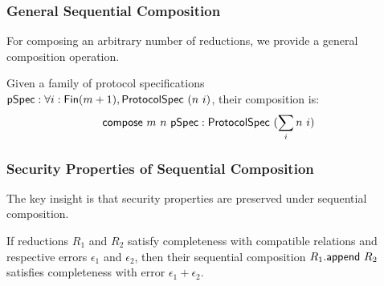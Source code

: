 \subsubsection{General Sequential Composition}

For composing an arbitrary number of reductions, we provide a general composition operation.

\begin{definition}
    \label{def:protocol_spec_compose}
    Given a family of protocol specifications $\mathsf{pSpec} : \forall i : \mathsf{Fin}(m+1), \mathsf{ProtocolSpec}\ (n\ i)$, their composition is:
    \[ \mathsf{compose}\ m\ n\ \mathsf{pSpec} : \mathsf{ProtocolSpec}\ (\sum_{i} n\ i) \]
\end{definition}

\begin{definition}
    \label{def:prover_compose}
\end{definition}

\begin{definition}
    \label{def:verifier_compose}
\end{definition}

\begin{definition}
    \label{def:reduction_compose}
\end{definition}

\subsubsection{Security Properties of Sequential Composition}

The key insight is that security properties are preserved under sequential composition.

\begin{theorem}
    \label{thm:completeness_append}
    If reductions $R_1$ and $R_2$ satisfy completeness with compatible relations and respective errors $\epsilon_1$ and $\epsilon_2$, then their sequential composition $R_1.\mathsf{append}\ R_2$ satisfies completeness with error $\epsilon_1 + \epsilon_2$.
\end{theorem}

